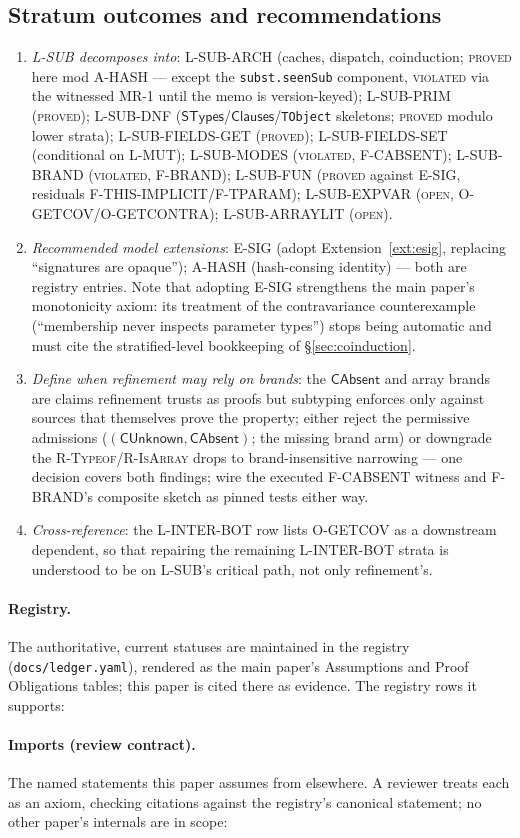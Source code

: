 \documentclass[11pt]{article}
\newcommand{\STypes}{\mathsf{STypes}}
\newcommand{\Clauses}{\mathsf{Clauses}}
\begin{document}
\subsection{Stratum outcomes and recommendations}

\begin{enumerate}
\item \emph{L-SUB decomposes into}: L-SUB-ARCH (caches, dispatch,
  coinduction; \textsc{proved} here mod A-HASH — except the
  \texttt{subst.seenSub} component, \textsc{violated} via the witnessed
  MR-1 until the memo is version-keyed); L-SUB-PRIM (\textsc{proved});
  L-SUB-DNF ($\STypes$/$\Clauses$/\texttt{TObject} skeletons;
  \textsc{proved} modulo lower strata); L-SUB-FIELDS-GET
  (\textsc{proved}); L-SUB-FIELDS-SET (conditional on L-MUT);
  L-SUB-MODES (\textsc{violated}, F-CABSENT); L-SUB-BRAND
  (\textsc{violated}, F-BRAND); L-SUB-FUN (\textsc{proved} against
  E-SIG, residuals F-THIS-IMPLICIT/F-TPARAM); L-SUB-EXPVAR
  (\textsc{open}, O-GETCOV/O-GETCONTRA); L-SUB-ARRAYLIT
  (\textsc{open}).
\item \emph{Recommended model extensions}:
  E-SIG (adopt Extension~\ref{ext:esig}, replacing ``signatures are
  opaque''); A-HASH (hash-consing identity) — both are registry
  entries. Note that adopting E-SIG strengthens the
  main paper's monotonicity axiom: its treatment of the contravariance
  counterexample (``membership never inspects parameter types'') stops
  being automatic and must cite the stratified-level bookkeeping of
  \S\ref{sec:coinduction}.
\item \emph{Define when refinement may rely on brands}: the
  $\mathsf{CAbsent}$ and array brands are claims refinement trusts as
  proofs but subtyping enforces only against sources that themselves
  prove the property; either reject the permissive admissions
  ($(\mathsf{CUnknown},\mathsf{CAbsent})$; the missing brand arm) or
  downgrade the \textsc{R-Typeof}/\textsc{R-IsArray} drops to
  brand-insensitive narrowing --- one decision covers both findings;
  wire the executed F-CABSENT witness and F-BRAND's composite sketch as
  pinned tests either way.
\item \emph{Cross-reference}: the L-INTER-BOT row lists O-GETCOV as a
  downstream dependent, so that repairing the remaining L-INTER-BOT
  strata is understood to be on L-SUB's critical path, not only
  refinement's.
\end{enumerate}

\paragraph{Registry.}
The authoritative, current statuses are maintained in the registry
(\texttt{docs/ledger.yaml}), rendered as the main paper's Assumptions and
Proof Obligations tables; this paper is cited there as evidence. The
registry rows it supports:



\paragraph{Imports (review contract).}
The named statements this paper assumes from elsewhere. A reviewer treats
each as an axiom, checking citations against the registry's canonical
statement; no other paper's internals are in scope:


\end{document}
